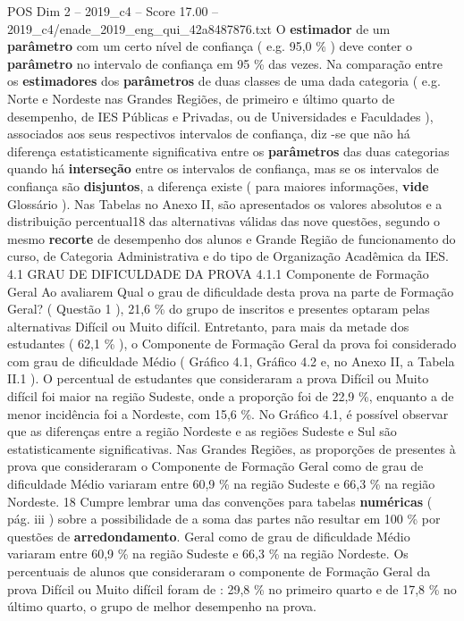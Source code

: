 \begin{textsample}{POS Dim 2 – 2019\_c4 – Score 17.00 – 2019\_c4/enade\_2019\_eng\_qui\_42a8487876.txt}
O \textbf{estimador} de um \textbf{parâmetro} com um certo nível de confiança ( e.g. 95,0 \% ) deve conter o \textbf{parâmetro} no intervalo de confiança em 95 \% das vezes.
Na comparação entre os \textbf{estimadores} dos \textbf{parâmetros} de duas classes de uma dada categoria ( e.g.
Norte e Nordeste nas Grandes Regiões, de primeiro e último quarto de desempenho, de IES Públicas e Privadas, ou de Universidades e Faculdades ), associados aos seus respectivos intervalos de confiança, diz -se que não há diferença estatisticamente significativa entre os \textbf{parâmetros} das duas categorias quando há \textbf{interseção} entre os intervalos de confiança, mas se os intervalos de confiança são \textbf{disjuntos}, a diferença existe ( para maiores informações, \textbf{vide} Glossário ).
Nas Tabelas no Anexo II, são apresentados os valores absolutos e a distribuição percentual18 das alternativas válidas das nove questões, segundo o mesmo \textbf{recorte} de desempenho dos alunos e Grande Região de funcionamento do curso, de Categoria Administrativa e do tipo de Organização Acadêmica da IES. 4.1 GRAU DE DIFICULDADE DA PROVA 4.1.1 Componente de Formação Geral Ao avaliarem Qual o grau de dificuldade desta prova na parte de Formação Geral? ( Questão 1 ), 21,6 \% do grupo de inscritos e presentes optaram pelas alternativas Difícil ou Muito difícil.
Entretanto, para mais da metade dos estudantes ( 62,1 \% ), o Componente de Formação Geral da prova foi considerado com grau de dificuldade Médio ( Gráfico 4.1, Gráfico 4.2 e, no Anexo II, a Tabela II.1 ).
O percentual de estudantes que consideraram a prova Difícil ou Muito difícil foi maior na região Sudeste, onde a proporção foi de 22,9 \%, enquanto a de menor incidência foi a Nordeste, com 15,6 \%.
No Gráfico 4.1, é possível observar que as diferenças entre a região Nordeste e as regiões Sudeste e Sul são estatisticamente significativas.
Nas Grandes Regiões, as proporções de presentes à prova que consideraram o Componente de Formação Geral como de grau de dificuldade Médio variaram entre 60,9 \% na região Sudeste e 66,3 \% na região Nordeste. 18 Cumpre lembrar uma das convenções para tabelas \textbf{numéricas} ( pág. iii ) sobre a possibilidade de a soma das partes não resultar em 100 \% por questões de \textbf{arredondamento}.
Geral como de grau de dificuldade Médio variaram entre 60,9 \% na região Sudeste e 66,3 \% na região Nordeste.
Os percentuais de alunos que consideraram o componente de Formação Geral da prova Difícil ou Muito difícil foram de : 29,8 \% no primeiro quarto e de 17,8 \% no último quarto, o grupo de melhor desempenho na prova.

\end{textsample}
